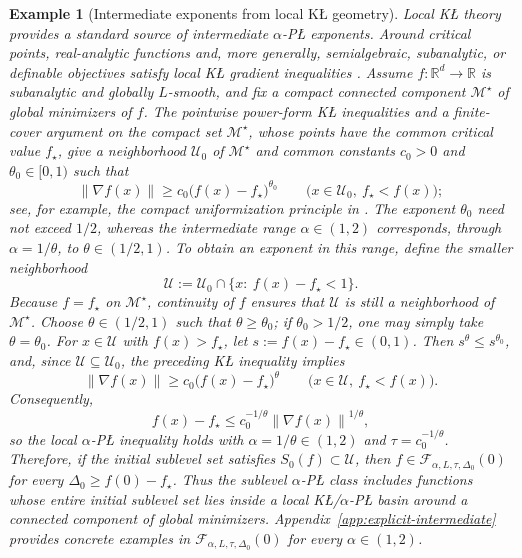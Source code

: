 \documentclass[11pt]{article}
\newtheorem{example}[theorem]{Example}
\newcommand{\R}{\mathbb{R}}
\newcommand{\norm}[1]{\left\lVert #1\right\rVert}
\begin{document}
\begin{example}[Intermediate exponents from local K\L{} geometry]
\label{ex:intermediate-kl}
Local K\L{} theory provides a standard source of intermediate \(\alpha\)-P\L{} exponents. Around critical points,
real-analytic functions and, more generally, semialgebraic, subanalytic, or definable objectives satisfy local K\L{}
gradient inequalities
\citep{Lojasiewicz1963,Kurdyka1998,BolteDaniilidisLewis2007,AttouchBolteRedontSoubeyran2010,LiPong2018}. Assume
\(f:\R^d\to\R\) is subanalytic and globally \(L\)-smooth, and fix a compact connected component
\(\mathcal M^\star\) of global minimizers of \(f\). The pointwise power-form K\L{} inequalities and a finite-cover
argument on the compact set \(\mathcal M^\star\), whose points have the common critical value \(f_\star\), give a
neighborhood \(\mathcal U_0\) of \(\mathcal M^\star\) and common constants \(c_0>0\) and
\(\theta_0\in[0,1)\) such that
\[
\norm{\nabla f(x)}
\ge
c_0\bigl(f(x)-f_\star\bigr)^{\theta_0}
\qquad
\bigl(x\in\mathcal U_0,\ f_\star<f(x)\bigr);
\]
see, for example, the compact uniformization principle in \citet[Lemma~6]{BolteSabachTeboulle2014}. The exponent
\(\theta_0\) need not exceed \(1/2\), whereas the intermediate range \(\alpha\in(1,2)\) corresponds, through
\(\alpha=1/\theta\), to \(\theta\in(1/2,1)\). To obtain an exponent in this range, define the smaller neighborhood
\[
\mathcal U:=\mathcal U_0\cap\{x:\ f(x)-f_\star<1\}.
\]
Because \(f=f_\star\) on \(\mathcal M^\star\), continuity of \(f\) ensures that \(\mathcal U\) is still a neighborhood
of \(\mathcal M^\star\). Choose \(\theta\in(1/2,1)\) such that \(\theta\ge\theta_0\); if
\(\theta_0>1/2\), one may simply take \(\theta=\theta_0\). For \(x\in\mathcal U\) with \(f(x)>f_\star\), let
\(s:=f(x)-f_\star\in(0,1)\). Then \(s^\theta\le s^{\theta_0}\), and, since
\(\mathcal U\subseteq\mathcal U_0\), the preceding K\L{} inequality implies
\[
\norm{\nabla f(x)}\ge c_0\bigl(f(x)-f_\star\bigr)^\theta
\qquad
\bigl(x\in\mathcal U,\ f_\star<f(x)\bigr).
\]
Consequently,
\[
f(x)-f_\star\le c_0^{-1/\theta}\norm{\nabla f(x)}^{1/\theta},
\]
so the local \(\alpha\)-P\L{} inequality holds with $\alpha=1/\theta\in(1,2)$ and
$\tau=c_0^{-1/\theta}$. Therefore, if the initial sublevel set satisfies \(S_0(f)\subset\mathcal U\), then
\(f\in\mathcal F_{\alpha,L,\tau,\Delta_0}(0)\) for every \(\Delta_0\ge f(0)-f_\star\). Thus the sublevel
\(\alpha\)-P\L{} class includes functions whose entire initial sublevel set lies inside a local
K\L{}/\(\alpha\)-P\L{} basin around a connected component of global minimizers.
Appendix~\ref{app:explicit-intermediate} provides concrete examples in
$\mathcal F_{\alpha,L,\tau,\Delta_0}(0)$ for every \(\alpha\in(1,2)\).
\end{example}
\end{document}
